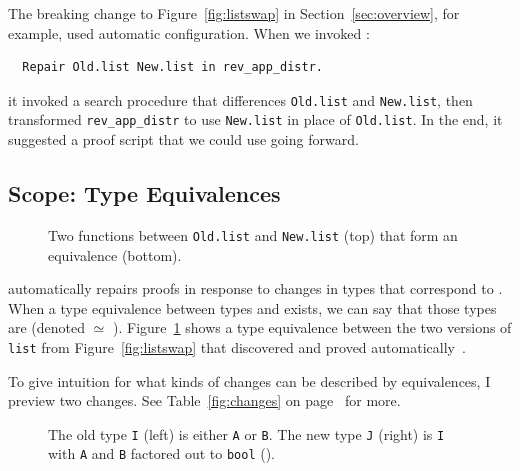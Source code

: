 The breaking change to Figure~\ref{fig:listswap} in Section~\ref{sec:overview}, for example, used automatic configuration.
When we invoked \toolnamec:

\begin{lstlisting}
  Repair Old.list New.list in rev_app_distr.
\end{lstlisting}
it invoked a search procedure that differences \lstinline{Old.list} and \lstinline{New.list},
then transformed \lstinline{rev_app_distr} to use \lstinline{New.list} in place of \lstinline{Old.list}.
In the end, it suggested a proof script that we could use going forward.

\subsection{Scope: Type Equivalences}
\label{sec:pi-scope}

\begin{figure}
\caption{Two functions between \lstinline{Old.list} and \lstinline{New.list} (top) that form an equivalence (bottom).}
\label{fig:equivalence}
\end{figure}

\toolnamec automatically repairs proofs in response to changes in types that correspond to .
When a type equivalence between types \Aa and \B exists, we can say that those types are  (denoted \Aa $\simeq$ \B). %
Figure~\ref{fig:equivalence} shows a type equivalence between the two versions of \lstinline{list}
from Figure~\ref{fig:listswap} that \toolnamec discovered and proved automatically~\href{https://github.com/uwplse/pumpkin-pi/blob/v2.0.0/plugin/coq/Swap.v}{}.

To give intuition for what kinds of changes can be described by equivalences, I preview two changes.
See Table~\ref{fig:changes} on page~\pageref{fig:changes} for more.

\begin{figure}
\begin{minipage}{0.48\columnwidth}

\end{minipage}
\hfill
\begin{minipage}{0.48\columnwidth}

\end{minipage}
\caption{The old type \lstinline{I} (left) is either \lstinline{A} or \lstinline{B}. The new type \lstinline{J} (right) is \lstinline{I} with \lstinline{A} and \lstinline{B} factored out to \lstinline{bool} ().}
\label{fig:equivalence2}
\end{figure}

